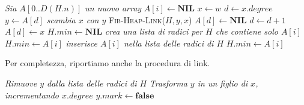 \begin{algorithm}[H]
\caption{CONSOLIDATE($H$)}
\begin{algorithmic}[1]
    \State \textit{Sia $A[0..D(H.n)]$ un nuovo array} 
        \State $A[i] \gets \textbf{NIL}$
    \EndFor
     
        \State $x \gets w$
        \State $d \gets x.degree$
         
            \State $y \gets A[d]$
                \State \textit{scambia $x$ con $y$}
            \EndIf
            \State \textsc{Fib-Heap-Link}($H, y, x$) 
            \State $A[d] \gets \textbf{NIL}$ 
            \State $d \gets d + 1$ 
        \EndWhile
        \State $A[d] \gets x$ 
    \EndFor
    \State $H.min \gets \textbf{NIL}$  
     
             
                \State \textit{crea una lista di radici per $H$ che contiene solo $A[i]$}
                \State $H.min \gets A[i]$ 
            \Else
                \State \textit{inserisce $A[i]$ nella lista delle radici di $H$} 
                    \State $H.min \gets A[i]$
                \EndIf
            \EndIf
        \EndIf
    \EndFor
\end{algorithmic}
\end{algorithm}

Per completezza, riportiamo anche la procedura di link.
\begin{algorithm}[H]
\caption{FIB-HEAP-LINK($H, y, x$)}
\begin{algorithmic}[1]
    \State \textit{Rimuove $y$ dalla lista delle radici di $H$}
    \State \textit{Trasforma $y$ in un figlio di $x$, incrementando $x.degree$}
    \State $y.mark \gets \textbf{false}$
\end{algorithmic}
\end{algorithm}

